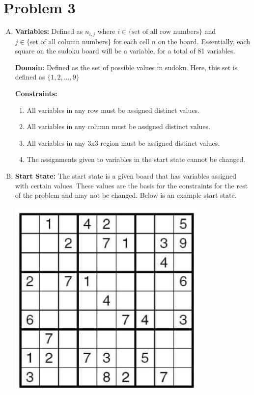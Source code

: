 \documentclass[10pt,a4paper]{article}
\begin{document}
	\section*{Problem 3}

	
	\begin{enumerate}[A.]

		\item
		
		\textbf{Variables:} Defined as $n_{i,j}$ where $i \in \text{\{set of all row numbers\}}$ and $j \in \text{\{set of all column numbers\}}$ for each cell $n$ on the board. Essentially, each square on the sudoku board will be a variable, for a total of 81 variables.
		
		\textbf{Domain:} Defined as the set of possible values in sudoku. Here, this set is defined as $\{ 1, 2, ..., 9 \}$
		
		\textbf{Constraints:}
		
		\begin{enumerate}[1.]
			\item All variables in any row must be assigned distinct values.
			\item All variables in any column must be assigned distinct values.
			\item All variables in any 3x3 region must be assigned distinct values.
			\item The assignments given to variables in the start state cannot be changed.
		\end{enumerate}
		
		\item
		
		\textbf{Start State:} The start state is a given board that has variables assigned with certain values. These values are the basis for the constraints for the rest of the problem and may not be changed. Below is an example start state.
		
		\begin{center}
			\includegraphics[scale=0.4]{sudoku_startstate}
		\end{center}
		

\end{enumerate}
\end{document}
